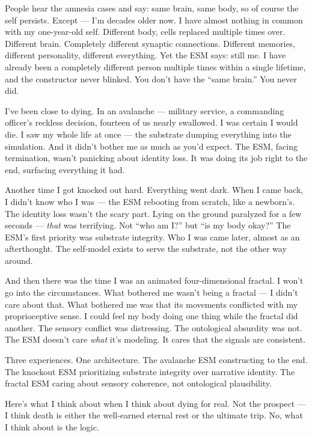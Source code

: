\documentclass[11pt, twoside, openright]{book}
\begin{document}
People hear the amnesia cases and say: same brain, same body, so of course the self persists. Except --- I'm decades older now. I have almost nothing in common with my one-year-old self. Different body, cells replaced multiple times over. Different brain. Completely different synaptic connections. Different memories, different personality, different everything. Yet the ESM says: still me. I have already been a completely different person multiple times within a single lifetime, and the constructor never blinked. You don't have the ``same brain.'' You never did.

I've been close to dying. In an avalanche --- military service, a commanding officer's reckless decision, fourteen of us nearly swallowed. I was certain I would die. I saw my whole life at once --- the substrate dumping everything into the simulation. And it didn't bother me as much as you'd expect. The ESM, facing termination, wasn't panicking about identity loss. It was doing its job right to the end, surfacing everything it had.

Another time I got knocked out hard. Everything went dark. When I came back, I didn't know who I was --- the ESM rebooting from scratch, like a newborn's. The identity loss wasn't the scary part. Lying on the ground paralyzed for a few seconds --- \textit{that} was terrifying. Not ``who am I?'' but ``is my body okay?'' The ESM's first priority was substrate integrity. Who I was came later, almost as an afterthought. The self-model exists to serve the substrate, not the other way around.

And then there was the time I was an animated four-dimensional fractal. I won't go into the circumstances. What bothered me wasn't being a fractal --- I didn't care about that. What bothered me was that its movements conflicted with my proprioceptive sense. I could feel my body doing one thing while the fractal did another. The sensory conflict was distressing. The ontological absurdity was not. The ESM doesn't care \textit{what} it's modeling. It cares that the signals are consistent.

Three experiences. One architecture. The avalanche ESM constructing to the end. The knockout ESM prioritizing substrate integrity over narrative identity. The fractal ESM caring about sensory coherence, not ontological plausibility.

Here's what I think about when I think about dying for real. Not the prospect --- I think death is either the well-earned eternal rest or the ultimate trip. No, what I think about is the logic.
\end{document}
